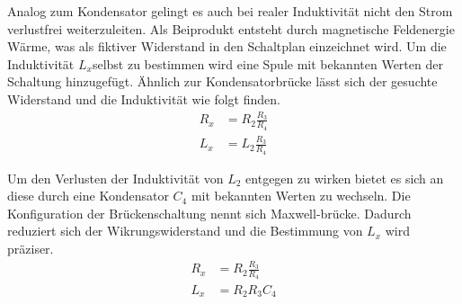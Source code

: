 Analog zum Kondensator gelingt es auch bei realer Induktivität nicht den Strom verlustfrei weiterzuleiten.
Als Beiprodukt entsteht durch magnetische Feldenergie Wärme, was als fiktiver Widerstand in den Schaltplan einzeichnet wird.
Um die Induktivität $L_x$selbst zu bestimmen wird eine Spule mit bekannten Werten der Schaltung hinzugefügt. 
Ähnlich zur Kondensatorbrücke lässt sich der gesuchte Widerstand und die Induktivität wie folgt finden.
\begin{align}
    \label{eqn:induk}
    R_x &= R_2\frac{R_3}{R_4} \\
    L_x &= L_2\frac{R_3}{R_4}
\end{align}

Um den Verlusten der Induktivität von $L_2$ entgegen zu wirken bietet es sich an diese durch eine Kondensator $C_4$ mit bekannten Werten
zu wechseln. Die Konfiguration der Brückenschaltung nennt sich Maxwell-brücke.
Dadurch reduziert sich der Wikrungswiderstand und die Bestimmung von $L_x$ wird präziser.
\begin{align}
    \label{eqn:stuff}
    R_x &= R_2\frac{R_3}{R_4} \\
    L_x &= R_2R_3C_4
\end{align}
\\
\newline
